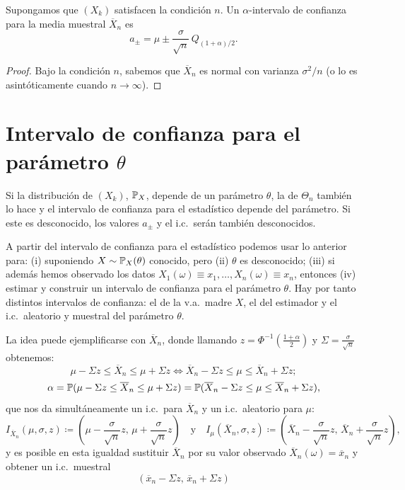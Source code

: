 \begin{proposicion}
Supongamos que $(X_k)$ satisfacen la condición $n$. Un $\alpha$-intervalo de confianza para la media muestral $\overline{X}_n$ es
\[
  a_\pm = \mu \pm \frac{\sigma}{\sqrt{n}}\,Q_{(1+\alpha)/2}.
\]
\end{proposicion}

\begin{proof}
Bajo la condición $n$, sabemos que $\overline{X}_n$ es normal con varianza $\sigma^2/n$ (o lo es asintóticamente cuando $n \to \infty$).
\end{proof}

\section{Intervalo de confianza para el parámetro $\theta$}

\begin{observacion}[31]
Si la distribución de $(X_k)$, $\mathbb{P}_X$, depende de un parámetro $\theta$, la de $\Theta_n$ también lo hace y el intervalo de confianza para el estadístico depende del parámetro. Si este es desconocido, los valores $a_\pm$ y el i.c.\ serán también desconocidos.

A partir del intervalo de confianza para el estadístico podemos usar lo anterior para: (i) suponiendo $X \sim \mathbb{P}_X(\theta)$ conocido, pero (ii) $\theta$ es desconocido; (iii) si además hemos observado los datos $X_1(\omega) \equiv x_1, \dots, X_n(\omega) \equiv x_n$, entonces (iv) estimar y construir un intervalo de confianza para el parámetro $\theta$. Hay por tanto distintos intervalos de confianza: el de la v.a.\ madre $X$, el del estimador y el i.c.\ aleatorio y muestral del parámetro $\theta$.

La idea puede ejemplificarse con $\overline{X}_n$, donde llamando $z = \Phi^{-1}\left(\frac{1+\alpha}{2}\right)$ y $\Sigma = \frac{\sigma}{\sqrt{n}}$ obtenemos:
\[
  \mu - \Sigma z \le \overline{X}_n \le \mu + \Sigma z \iff \overline{X}_n - \Sigma z \le \mu \le \overline{X}_n + \Sigma z;
\]
\[
  \alpha = \mathbb{P}(\mu - \Sigma z \le \overline{X}_n \le \mu + \Sigma z) = \mathbb{P}(\overline{X}_n - \Sigma z \le \mu \le \overline{X}_n + \Sigma z),
\]
que nos da simultáneamente un i.c.\ para $\overline{X}_n$ y un i.c.\ aleatorio para $\mu$:
\[
  I_{\overline{X}_n}(\mu, \sigma, z) \coloneqq \left(\mu - \frac{\sigma}{\sqrt{n}}z,\, \mu + \frac{\sigma}{\sqrt{n}}z\right) \quad \text{y} \quad I_{\mu}(\overline{X}_n, \sigma, z) \coloneqq \left(\overline{X}_n - \frac{\sigma}{\sqrt{n}}z,\, \overline{X}_n + \frac{\sigma}{\sqrt{n}}z\right),
\]
y es posible en esta igualdad sustituir $\overline{X}_n$ por su valor observado $\overline{X}_n(\omega) = \overline{x}_n$ y obtener un i.c.\ muestral 
$$(\overline{x}_n - \Sigma z,\, \overline{x}_n + \Sigma z)$$
\end{observacion}

